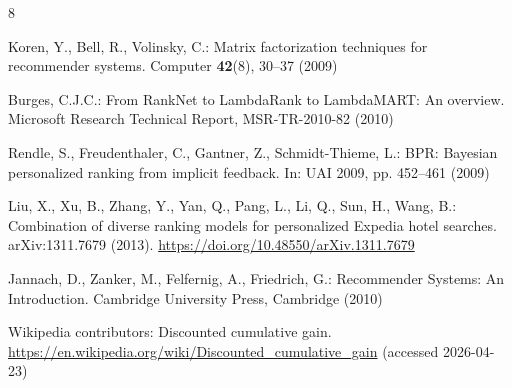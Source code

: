 \documentclass{llncs}
\begin{document}
%
%
%
% 
% 
%
\begin{thebibliography}{8}

Koren, Y., Bell, R., Volinsky, C.: Matrix factorization techniques for recommender systems.
Computer \textbf{42}(8), 30--37 (2009)

Burges, C.J.C.: From RankNet to LambdaRank to LambdaMART: An overview.
Microsoft Research Technical Report, MSR-TR-2010-82 (2010)

Rendle, S., Freudenthaler, C., Gantner, Z., Schmidt-Thieme, L.: BPR: Bayesian personalized ranking from implicit feedback.
In: UAI 2009, pp. 452--461 (2009)

Liu, X., Xu, B., Zhang, Y., Yan, Q., Pang, L., Li, Q., Sun, H., Wang, B.: Combination of diverse ranking models for personalized Expedia hotel searches.
arXiv:1311.7679 (2013). \url{https://doi.org/10.48550/arXiv.1311.7679}

Jannach, D., Zanker, M., Felfernig, A., Friedrich, G.: Recommender Systems: An Introduction.
Cambridge University Press, Cambridge (2010)

Wikipedia contributors: Discounted cumulative gain.
\url{https://en.wikipedia.org/wiki/Discounted_cumulative_gain} (accessed 2026-04-23)

\end{thebibliography}
\end{document}
